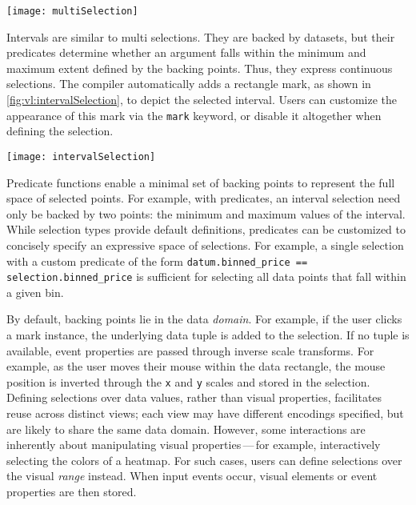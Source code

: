 \begin{figure*}[h!]
  \centering
  \texttt{[image: multiSelection]}
  \caption{Switching from a \emph{single} to \emph{multi} selection. The first
  value is selected on click, and additional values on shift-click.}
  \label{fig:vl:multiSelection}
\end{figure*}

Intervals are similar to multi selections. They are backed by datasets, but
their predicates determine whether an argument falls within the minimum and
maximum extent defined by the backing points. Thus, they express continuous
selections. The compiler automatically adds a rectangle mark, as shown in
\cref{fig:vl:intervalSelection}, to depict the selected interval. Users can
customize the appearance of this mark via the \texttt{mark} keyword, or disable
it altogether when defining the selection.

\begin{figure*}[h!]
  \centering
  \texttt{[image: intervalSelection]}
  \caption{Highlight a continuous range of points using an \emph{interval}
  selection. A rectangle mark is automatically added to depict the interval
  extents.}
  \label{fig:vl:intervalSelection}
\end{figure*}

Predicate functions enable a minimal set of backing points to represent the full
space of selected points. For example, with predicates, an interval selection
need only be backed by two points: the minimum and maximum values of the
interval. While selection types provide default definitions, predicates can be
customized to concisely specify an expressive space of selections. For example,
a single selection with a custom predicate of the form
\texttt{datum.binned\_price == selection.binned\_price} is sufficient for
selecting all data points that fall within a given bin.

By default, backing points lie in the data \emph{domain}. For example, if the
user clicks a mark instance, the underlying data tuple is added to the
selection. If no tuple is available, event properties are passed through inverse
scale transforms. For example, as the user moves their mouse within the data
rectangle, the mouse position is inverted through the \texttt{x} and \texttt{y}
scales and stored in the selection. Defining selections over data values, rather
than visual properties, facilitates reuse across distinct views; each view may
have different encodings specified, but are likely to share the same data
domain. However, some interactions are inherently about manipulating visual
properties\,---\,for example, interactively selecting the colors of a heatmap.
For such cases, users can define selections over the visual \emph{range}
instead. When input events occur, visual elements or event properties are then
stored.

